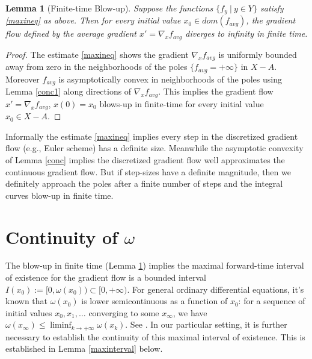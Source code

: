 \documentclass[12pt]{amsart}
\newtheorem{lem}{Lemma}
\theoremstyle{definition}
\theoremstyle{remark}
\begin{document}
\begin{lem}[Finite-time Blow-up] \label{ftbu}
Suppose the functions $\{f_y~|~ y\in Y\}$ satisfy \eqref{maxineq} as above. Then for every initial value $x_0\in dom(f_{avg})$, the gradient flow defined by the average gradient $x'=\nabla_x f_{avg}$ diverges to infinity in finite time.
\end{lem}
\begin{proof}
The estimate \eqref{maxineq} shows the gradient $\nabla_x f_{avg}$ is uniformly bounded away from zero in the neighborhoods of the poles $\{f_{avg}=+\infty\}$ in $X-A$. Moreover $f_{avg}$ is asymptotically convex in neighborhoods of the poles using Lemma \ref{conc1} along directions of $\nabla_x f_{avg}$. This implies the gradient flow $x'=\nabla_x f_{avg}$, $x(0)=x_0$ blows-up in finite-time for every initial value $x_0\in X-A$. 
\end{proof}


Informally the estimate \eqref{maxineq} implies every step in the discretized gradient flow (e.g., Euler scheme) has a definite size. Meanwhile the asymptotic convexity of Lemma \ref{conc} implies the discretized gradient flow well approximates the continuous gradient flow. But if step-sizes have a definite magnitude, then we definitely approach the poles after a finite number of steps and the integral curves blow-up in finite time.

\section{Continuity of $\omega$}
The blow-up in finite time (Lemma \ref{ftbu}) implies the maximal forward-time interval of existence for the gradient flow is a bounded interval $I(x_0):=[0, \omega(x_0)) \subset [0, +\infty)$. For general ordinary differential equations, it's known that $\omega(x_0)$ is lower semicontinuous as a function of $x_0$: for a sequence of initial values $x_0, x_1, \ldots$ converging to some $x_\infty$, we have $\omega(x_\infty) \leq \liminf_{k\to +\infty} \omega(x_k)$. See \cite[Theorem 2.1, pp.94]{Hart}. In our particular setting, it is further necessary to establish the continuity of this maximal interval of existence. This is established in Lemma \ref{maxinterval} below.
\end{document}
